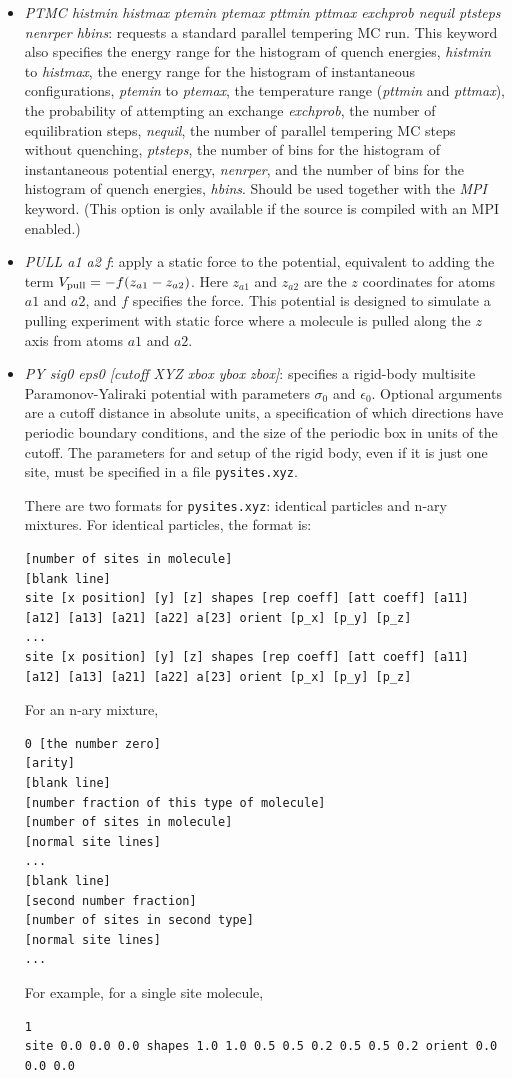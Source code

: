 \documentclass[12pt,a4paper,dvips]{article}
\begin{document}
\begin{itemize}
\item {\it PTMC histmin histmax ptemin ptemax pttmin pttmax exchprob nequil ptsteps nenrper hbins\/}: 
requests a standard parallel tempering MC run.
This keyword also specifies the energy range for the histogram of quench energies,
{\it histmin\/} to {\it histmax\/},
the energy range for the histogram of instantaneous configurations, {\it ptemin} to {\it ptemax}, 
the temperature range ({\it pttmin} and {\it pttmax}), 
the probability of attempting an exchange {\it exchprob}, the 
number of equilibration steps, {\it nequil},
the number of parallel tempering MC steps without quenching,  {\it ptsteps},
the number of bins for the histogram of instantaneous potential energy, {\it nenrper}, and
the number of bins for the histogram of quench energies, {\it hbins}.
Should be used together with the {\it MPI\/} keyword. %
(This option is only available if the source is compiled with an MPI enabled.)  

\item {\it PULL a1 a2 f\/}: apply a static force to the potential, equivalent to adding
the term $V_{\rm pull}=-f(z_{a1}-z_{a2})$. Here $z_{a1}$ and $z_{a2}$ are the $z$
coordinates for atoms $a1$ and $a2$, and $f$ specifies the force.
This potential is designed to simulate a pulling experiment with static force where
a molecule is pulled along the $z$ axis from atoms $a1$ and $a2$.

\item {\it PY sig0 eps0 [cutoff XYZ xbox ybox zbox]\/}: specifies a rigid-body multisite Paramonov-Yaliraki\cite{ParamonovY05} potential with parameters $\sigma_0$ and $\epsilon_0$. Optional arguments are
a cutoff distance in absolute units, a specification of which directions have periodic boundary
conditions, and the size of the periodic box in units of the cutoff. The parameters for and setup
of the rigid body, even if it is just one site, must be specified in a file {\tt pysites.xyz}.

There are two formats for {\tt pysites.xyz}: identical particles and n-ary mixtures. For identical
particles, the format is:
\begin{verbatim}
[number of sites in molecule]
[blank line]
site [x position] [y] [z] shapes [rep coeff] [att coeff] [a11] [a12] [a13] [a21] [a22] a[23] orient [p_x] [p_y] [p_z]
...
site [x position] [y] [z] shapes [rep coeff] [att coeff] [a11] [a12] [a13] [a21] [a22] a[23] orient [p_x] [p_y] [p_z]
\end{verbatim}
For an n-ary mixture,
\begin{verbatim}
0 [the number zero]
[arity]
[blank line]
[number fraction of this type of molecule]
[number of sites in molecule]
[normal site lines]
...
[blank line]
[second number fraction]
[number of sites in second type]
[normal site lines]
...
\end{verbatim}
For example, for a single site molecule,
\begin{verbatim}
1
site 0.0 0.0 0.0 shapes 1.0 1.0 0.5 0.5 0.2 0.5 0.5 0.2 orient 0.0 0.0 0.0
\end{verbatim}


\end{itemize}
\end{document}
